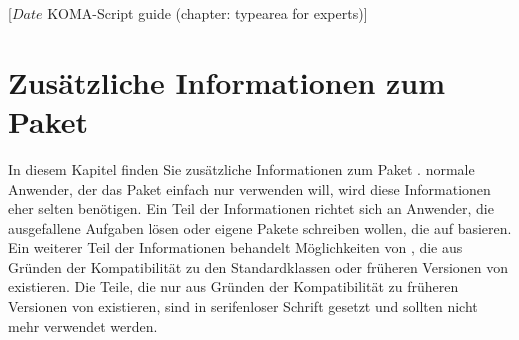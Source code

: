 %
%
%
%
%
%
%
%
% 
%
%
%
%

                 [$Date$
                  KOMA-Script guide (chapter: typearea for experts)]

\chapter{Zusätzliche Informationen zum Paket }

\BeginIndexGroup {} In diesem Kapitel finden Sie
zusätzliche Informationen zum Paket
\hyperref[cha:typearea]{}.  normale Anwender, der das Paket
einfach nur verwenden will, wird diese Informationen eher selten
benötigen. Ein Teil der Informationen richtet sich an Anwender, die
ausgefallene Aufgaben lösen oder eigene Pakete schreiben wollen, die auf
 basieren. Ein weiterer Teil der Informationen behandelt
Möglichkeiten von , die aus Gründen der Kompatibilität zu
den Standardklassen oder früheren Versionen von \KOMAScript{} existieren. Die
Teile, die nur aus Gründen der Kompatibilität zu früheren Versionen von
\KOMAScript{} existieren, sind in serifenloser Schrift gesetzt und sollten
nicht mehr verwendet werden.


